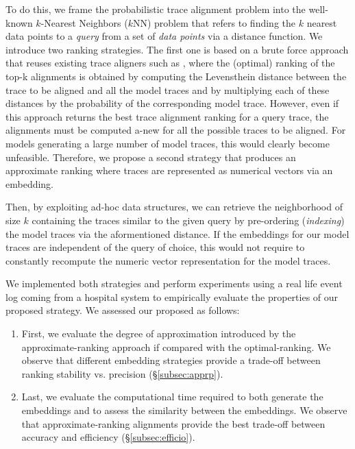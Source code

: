 To do this, we frame the probabilistic trace alignment problem into the well-known $k$-Nearest Neighbors ($k$NN) problem \cite{Altman} that refers to finding the $k$ nearest data points to a \textit{query}  from a set  of \textit{data points} via a distance function.
We introduce two ranking strategies. The first one is based on a brute force approach that reuses existing trace aligners such as \cite{DBLP:conf/edoc/AdriansyahDA11,LeoniM17}, where the (optimal) ranking of the top-k alignments is obtained by computing the Levensthein distance between the trace to be aligned and all the model traces and by multiplying each of these distances by the probability of the corresponding model trace. However, even if this approach returns the best trace alignment ranking for a query trace, the alignments must be computed a-new for all the possible traces to be aligned. For models generating a large number of model traces, this would clearly become unfeasible. Therefore, we propose a second strategy that produces an approximate ranking where traces are represented as numerical vectors via an embedding. {Then, by exploiting ad-hoc data structures,
	we can retrieve the neighborhood of size $k$ containing the traces similar to the given query  by pre-ordering (\textit{indexing}) the model traces  via the aformentioned distance. 
	If the embeddings for our model traces are independent of the query of choice, this would not require to constantly recompute the numeric vector representation for the model traces.
	
	We implemented both strategies and perform experiments using a real life event log coming from a hospital system to empirically evaluate the properties of our proposed  strategy. We assessed our proposed as follows:
\begin{enumerate}
	\item First, we evaluate the degree of approximation introduced by the approximate-ranking approach if compared with the optimal-ranking. We observe that different embedding strategies provide a trade-off between ranking stability vs. precision (\S\ref{subsec:apprp}).
	\item Last, we evaluate the computational time required to both generate the embeddings and to assess the similarity between the embeddings. We observe that approximate-ranking alignments provide the best trade-off between accuracy and efficiency (\S\ref{subsec:efficio}).
\end{enumerate}

}
